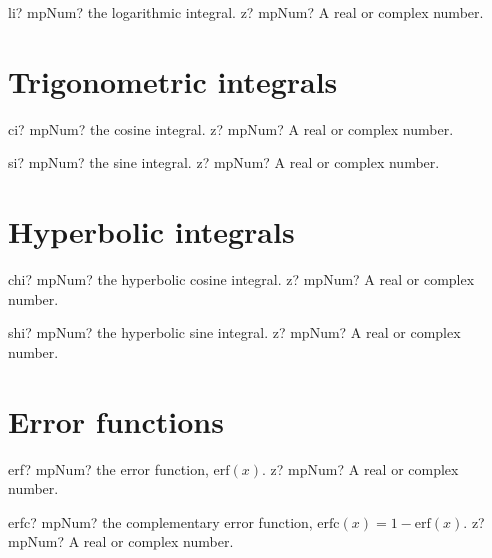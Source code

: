 \documentclass[12pt,a4paper,openany]{book}
\begin{document}
\begin{mpFunctionsExtract}
\mpFunctionOne
{li? mpNum? the logarithmic integral.}
{z? mpNum? A real or complex number.}
\end{mpFunctionsExtract}

\section{Trigonometric integrals}

\begin{mpFunctionsExtract}
\mpFunctionOne
{ci? mpNum? the cosine integral.}
{z? mpNum? A real or complex number.}
\end{mpFunctionsExtract}

\begin{mpFunctionsExtract}
\mpFunctionOne
{si? mpNum? the sine integral.}
{z? mpNum? A real or complex number.}
\end{mpFunctionsExtract}

\section{Hyperbolic integrals}

\begin{mpFunctionsExtract}
\mpFunctionOne
{chi? mpNum? the hyperbolic cosine integral.}
{z? mpNum? A real or complex number.}
\end{mpFunctionsExtract}

\begin{mpFunctionsExtract}
\mpFunctionOne
{shi? mpNum? the hyperbolic sine integral.}
{z? mpNum? A real or complex number.}
\end{mpFunctionsExtract}

\section{Error functions}

\begin{mpFunctionsExtract}
\mpFunctionOne
{erf? mpNum? the error function, $\text{erf}(x)$.}
{z? mpNum? A real or complex number.}
\end{mpFunctionsExtract}

\begin{mpFunctionsExtract}
\mpFunctionOne
{erfc? mpNum? the complementary error function, $\text{erfc}(x)=1-\text{erf}(x)$.}
{z? mpNum? A real or complex number.}
\end{mpFunctionsExtract}
\end{document}
